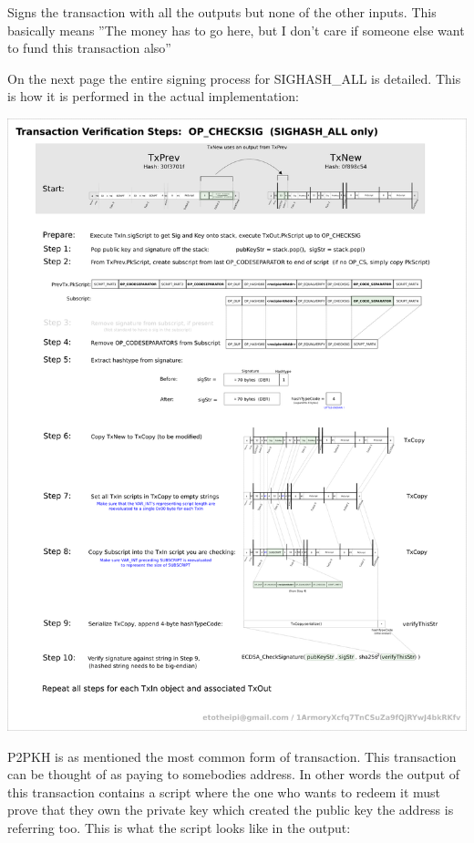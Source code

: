 Signs the transaction with all the outputs but none of the other inputs. This basically means ''The money has to go here, but I don't care if someone else want to fund this transaction also''

On the next page the entire signing process for SIGHASH\_ALL is detailed. This is how it is performed in the actual implementation:
\newpage
\centerline{\includegraphics[width=1.35\textwidth]{background/images/checksig_in_detail.png}}
\newpage

\label{p2pkh}
P2PKH is as mentioned the most common form of transaction. This transaction can be thought of as paying to somebodies address. In other words the output of this transaction contains a script where the one who wants to redeem it must prove that they own the private key which created the public key the address is referring too. This is what the script looks like in the output:

